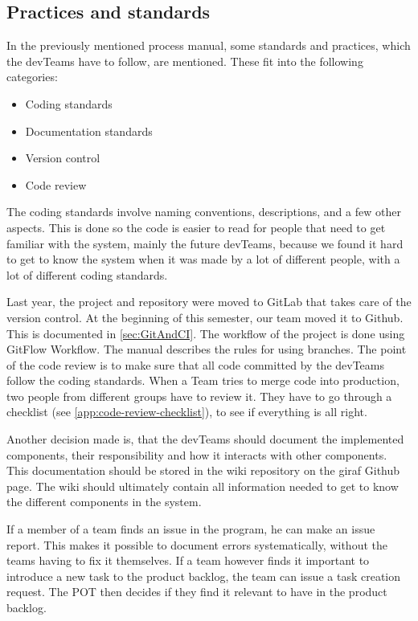 \subsection{Practices and standards}

In the previously mentioned process manual, some standards and practices, which the \glspl{devTeam} have to follow, are mentioned. These fit into the following categories:

\begin{itemize}
    \item Coding standards
    \item Documentation standards
    \item Version control
    \item Code review
\end{itemize}

The coding standards involve naming conventions, descriptions, and a few other aspects. This is done so the code is easier to read for people that need to get familiar with the system, mainly the future \glspl{devTeam}, because we found it hard to get to know the system when it was made by a lot of different people, with a lot of different coding standards.

Last year, the project and repository were moved to GitLab that takes care of the version control. At the beginning of this semester, our team moved it to Github. This is documented in \autoref{sec:GitAndCI}. The workflow of the project is done using GitFlow Workflow. The manual describes the rules for using branches. The point of the code review is to make sure that all code committed by the \glspl{devTeam} follow the coding standards. When a Team tries to merge code into production, two people from different groups have to review it. They have to go through a checklist (see \autoref{app:code-review-checklist}), to see if everything is all right.

Another decision made is, that the \glspl{devTeam} should document the implemented components, their responsibility and how it interacts with other components. This documentation should be stored in the wiki repository on the \gls{giraf} Github page. The wiki should ultimately contain all information needed to get to know the different components in the system.

If a member of a team finds an issue in the program, he can make an issue report. This makes it possible to document errors systematically, without the \glspl{team} having to fix it themselves. If a \gls{team} however finds it important to introduce a new task to the product backlog, the team can issue a task creation request. The \gls{POT} then decides if they find it relevant to have in the product backlog.

